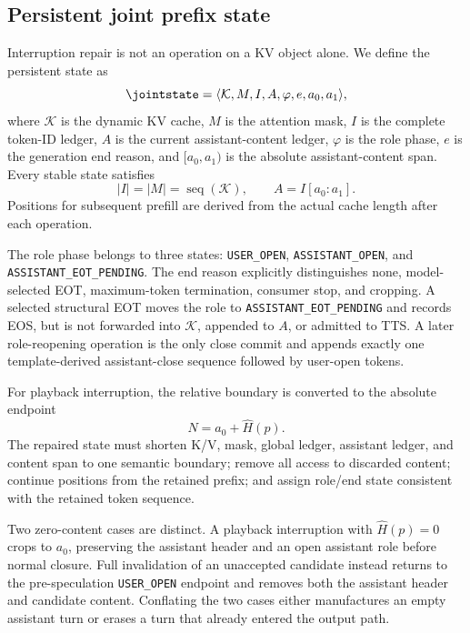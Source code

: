 \subsection{Persistent joint prefix state}

Interruption repair is not an operation on a KV object alone. We define the persistent state as
\begin{equation}
\jointstate=\langle\mathcal{K},M,I,A,\varphi,e,a_0,a_1\rangle,
\label{eq:joint-state}
\end{equation}
where $\mathcal{K}$ is the dynamic KV cache, $M$ is the attention mask, $I$ is the complete token-ID ledger, $A$ is the current assistant-content ledger, $\varphi$ is the role phase, $e$ is the generation end reason, and $[a_0,a_1)$ is the absolute assistant-content span. Every stable state satisfies
\begin{equation}
|I|=|M|=\operatorname{seq}(\mathcal{K}),\qquad A=I[a_0:a_1].
\label{eq:invariants}
\end{equation}
Positions for subsequent prefill are derived from the actual cache length after each operation.

The role phase belongs to three states: \texttt{USER\_OPEN}, \texttt{ASSISTANT\_OPEN}, and \texttt{ASSISTANT\_EOT\_PENDING}. The end reason explicitly distinguishes none, model-selected EOT, maximum-token termination, consumer stop, and cropping. A selected structural EOT moves the role to \texttt{ASSISTANT\_EOT\_PENDING} and records EOS, but is not forwarded into $\mathcal{K}$, appended to $A$, or admitted to TTS. A later role-reopening operation is the only close commit and appends exactly one template-derived assistant-close sequence followed by user-open tokens.

For playback interruption, the relative boundary is converted to the absolute endpoint
\begin{equation}
N=a_0+\widehat H(p).
\label{eq:absolute-crop}
\end{equation}
The repaired state must shorten K/V, mask, global ledger, assistant ledger, and content span to one semantic boundary; remove all access to discarded content; continue positions from the retained prefix; and assign role/end state consistent with the retained token sequence.

Two zero-content cases are distinct. A playback interruption with $\widehat H(p)=0$ crops to $a_0$, preserving the assistant header and an open assistant role before normal closure. Full invalidation of an unaccepted candidate instead returns to the pre-speculation \texttt{USER\_OPEN} endpoint and removes both the assistant header and candidate content. Conflating the two cases either manufactures an empty assistant turn or erases a turn that already entered the output path.
